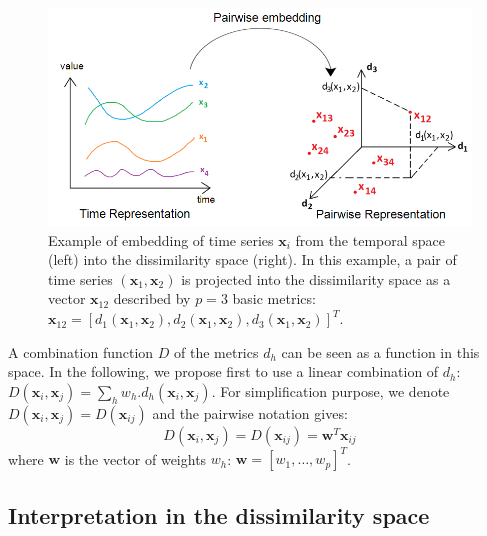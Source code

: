 \begin{figure}[h!]
	\begin{minipage}[b]{1.0\linewidth}
		\centering
		\includegraphics[width=0.9\linewidth]{images/PairwiseEmbedding}
	\end{minipage}
	\caption{Example of embedding of time series $\textbf{x}_i$ from the temporal space (left) into the dissimilarity space (right). In this example, a pair of time series $(\textbf{x}_1, \textbf{x}_2)$ is projected into the dissimilarity space as a vector $\textbf{x}_{12}$ described by $p=3$ basic metrics: $\textbf{x}_{12} = [d_1(\textbf{x}_1, \textbf{x}_2), d_2(\textbf{x}_1, \textbf{x}_2), d_3(\textbf{x}_1, \textbf{x}_2)]^T$.}
	\label{fig:PairwiseEmbedding}
\end{figure}

A combination function $D$ of the metrics $d_h$ can be seen as a function in this space. In the following, we propose first to use a linear combination of $d_h$: $D(\textbf{x}_i,\textbf{x}_j) = \sum_h w_h.d_h(\textbf{x}_i,\textbf{x}_j)$. For simplification purpose, we denote $D(\textbf{x}_i,\textbf{x}_j) = D(\textbf{x}_{ij})$ and the pairwise notation gives:
\begin{equation}
D(\textbf{x}_i,\textbf{x}_j) = D(\textbf{x}_{ij})=\textbf{w}^T\textbf{x}_{ij}
\label{eq:D_linear}
\end{equation}
where $\textbf{w}$ is the vector of weights $w_h$: $\textbf{w}=[w_1, \ldots, w_p]^T$.


\subsection{Interpretation in the dissimilarity space}

